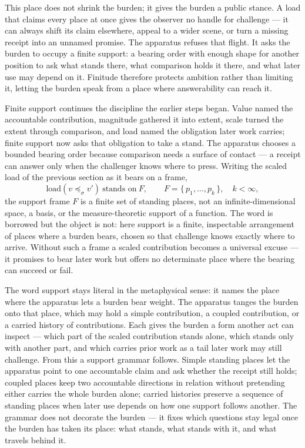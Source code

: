 This place does not shrink the burden; it gives the burden a public stance. A load that claims every place at once gives the observer no handle for challenge --- it can always shift its claim elsewhere, appeal to a wider scene, or turn a missing receipt into an unnamed promise. The apparatus refuses that flight. It asks the burden to occupy a finite support: a bearing order with enough shape for another position to ask what stands there, what comparison holds it there, and what later use may depend on it. Finitude therefore protects ambition rather than limiting it, letting the burden speak from a place where answerability can reach it.

Finite support continues the discipline the earlier steps began. Value named the accountable contribution, magnitude gathered it into extent, scale turned the extent through comparison, and load named the obligation later work carries; finite support now asks that obligation to take a stand. The apparatus chooses a bounded bearing order because comparison needs a surface of contact --- a receipt can answer only when the challenger knows where to press. Writing the scaled load of the previous section as it bears on a frame,
\[ \mathrm{load}(v \preceq_{\sigma} v') \ \text{stands on}\ F, \qquad F = \{\,p_1, \dots, p_k\,\}, \quad k < \infty, \]
the support frame $F$ is a finite set of standing places, not an infinite-dimensional space, a basis, or the measure-theoretic support of a function. The word is borrowed but the object is not: here support is a finite, inspectable arrangement of places where a burden bears, chosen so that challenge knows exactly where to arrive. Without such a frame a scaled contribution becomes a universal excuse --- it promises to bear later work but offers no determinate place where the bearing can succeed or fail.

The word support stays literal in the metaphysical sense: it names the place where the apparatus lets a burden bear weight. The apparatus tanges the burden onto that place, which may hold a simple contribution, a coupled contribution, or a carried history of contributions. Each gives the burden a form another act can inspect --- which part of the scaled contribution stands alone, which stands only with another part, and which carries prior work as a tail later work may still challenge. From this a support grammar follows. Simple standing places let the apparatus point to one accountable claim and ask whether the receipt still holds; coupled places keep two accountable directions in relation without pretending either carries the whole burden alone; carried histories preserve a sequence of standing places when later use depends on how one support follows another. The grammar does not decorate the burden --- it fixes which questions stay legal once the burden has taken its place: what stands, what stands with it, and what travels behind it.

